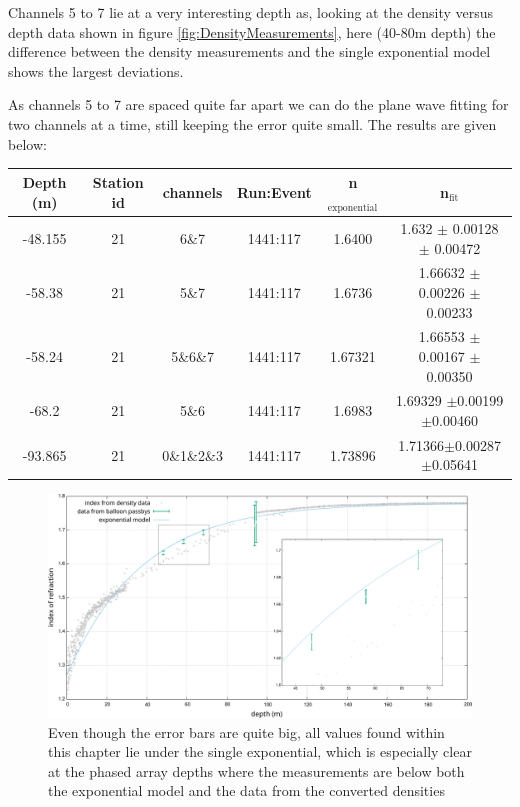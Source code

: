 Channels 5 to 7 lie at a very interesting depth as, looking at 
the density versus depth data shown in figure \ref{fig:DensityMeasurements},
here (40-80m depth) the difference between the density measurements and the single
exponential model shows the largest deviations. 

As channels 5 to 7 are spaced quite far apart we can do the plane wave fitting 
for two channels at a time, still keeping the error quite small. The results are given below:
\begin{center}
\begin{tabular}{||c c c c c c||}
 \hline
 Depth (m) & Station id & channels & Run:Event & n$_\text{exponential}$ & n$_\text{fit}$\\ 
 \hline\hline
 -48.155 & 21 & 6\&7 & 1441:117 & 1.6400 & 1.632 $\pm$ 0.00128 $\pm$ 0.00472\\
 -58.38 & 21 & 5\&7 & 1441:117 & 1.6736 & 1.66632 $\pm$ 0.00226 $\pm$ 0.00233 \\
 -58.24 & 21 & 5\&6\&7 & 1441:117 & 1.67321 & 1.66553 $\pm$ 0.00167 $\pm$ 0.00350 \\
 -68.2 & 21 & 5\&6 & 1441:117 & 1.6983 & 1.69329 $\pm$0.00199$\pm$0.00460 \\
 -93.865 & 21 & 0\&1\&2\&3 & 1441:117 & 1.73896 & 1.71366$\pm$0.00287$\pm$0.05641\\
 \hline
\end{tabular}
\end{center}
\begin{figure}
	\centering
	\includegraphics[width=\textwidth]{figures/ResultWithZoom.pdf}
  \caption{Even though the error bars are quite big, all values found within this chapter lie under the single exponential, 
    which is especially clear at the phased array depths where the measurements
    are below both the exponential model and the data from the converted densities}
	\label{fig:Results}
\end{figure}

